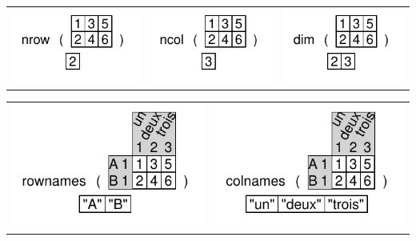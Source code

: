 \documentclass[pdflatex]{article}
\begin{document}
\begin{tabular}{ccc}
\includegraphics{nrow.pdf} & \includegraphics{ncol.pdf} & \includegraphics{dim.pdf}
\end{tabular}

\begin{tabular}{cc}
\includegraphics{rownames.pdf} & \includegraphics{colnames.pdf}
\end{tabular}
\end{document}
